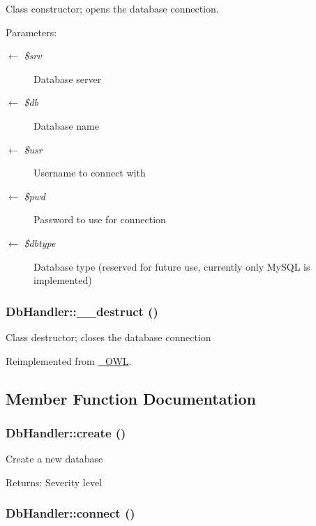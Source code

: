 Class constructor; opens the database connection.

\begin{Desc}
\item[Parameters:]
\begin{description}
\item[\mbox{$\leftarrow$} {\em \$srv}]Database server \item[\mbox{$\leftarrow$} {\em \$db}]Database name \item[\mbox{$\leftarrow$} {\em \$usr}]Username to connect with \item[\mbox{$\leftarrow$} {\em \$pwd}]Password to use for connection \item[\mbox{$\leftarrow$} {\em \$dbtype}]Database type (reserved for future use, currently only MySQL is implemented) \end{description}
\end{Desc}
\hypertarget{classDbHandler_7cd6bd727d1f296eb5dbfae6ca36ab3f}{
\subsubsection{\setlength{\rightskip}{0pt plus 5cm}DbHandler::\_\-\_\-destruct ()}}
\label{classDbHandler_7cd6bd727d1f296eb5dbfae6ca36ab3f}


Class destructor; closes the database connection 

Reimplemented from \hyperlink{class__OWL_44fd2222476a3109286cc82d92b6bbcc}{\_\-OWL}.

\subsection{Member Function Documentation}
\hypertarget{classDbHandler_c9e93cb0ab57f03b2719eebd0c0ee2ef}{
\subsubsection{\setlength{\rightskip}{0pt plus 5cm}DbHandler::create ()}}
\label{classDbHandler_c9e93cb0ab57f03b2719eebd0c0ee2ef}


Create a new database

\begin{Desc}
\item[Returns:]Severity level \end{Desc}
\hypertarget{classDbHandler_9cf52ba614981a0082063d57290d3b7c}{
\subsubsection{\setlength{\rightskip}{0pt plus 5cm}DbHandler::connect ()}}
\label{classDbHandler_9cf52ba614981a0082063d57290d3b7c}


